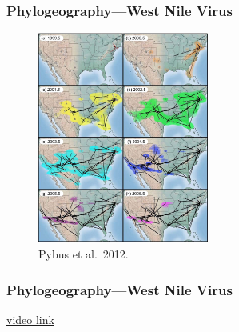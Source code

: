 \begin{frame}
    \frametitle{Phylogeography---West Nile Virus}
    \begin{figure}
        \begin{center}
        \includegraphics[width=0.5\textwidth]{../images/pybus-fig2.jpg}
        \caption{\tiny Pybus et al.\ 2012.}
        \end{center}
    \end{figure}
\end{frame}

\begin{frame}
    \frametitle{Phylogeography---West Nile Virus}
    \href{http://www.pnas.org/content/suppl/2012/08/23/1206598109.DCSupplemental/sm01.mp4}{video link}
\end{frame}







